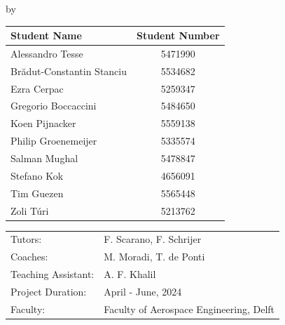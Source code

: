 
\begin{titlepage}

\begin{center}

{\makeatletter
\largetitlestyle\fontsize{45}{45}\selectfont\@title
\makeatother}

{\makeatletter
\ifdefvoid{\@subtitle}{}{\bigskip\titlestyle\fontsize{20}{20}\selectfont\@subtitle}
\makeatother}

\bigskip
\bigskip

by

\bigskip
\bigskip

{\makeatletter
\largetitlestyle\fontsize{25}{25}\selectfont\@author
\makeatother}

\bigskip
\bigskip

\setlength\extrarowheight{2pt}
\begin{tabular}{lc}
    Student Name              & Student Number \\\midrule
    Alessandro Tesse          & 5471990 \\
    Brădut-Constantin Stanciu & 5534682 \\
    Ezra Cerpac               & 5259347 \\
    Gregorio Boccaccini       & 5484650 \\
    Koen Pijnacker            & 5559138 \\
    Philip Groenemeijer       & 5335574 \\
    Salman Mughal             & 5478847 \\
    Stefano Kok               & 4656091 \\
    Tim Guezen                & 5565448 \\
    Zoli Túri                 & 5213762 \\
\end{tabular}

\vfill

\begin{tabular}{ll}
    Tutors: &  F. Scarano, F. Schrijer \\
    Coaches: & M. Moradi, T. de Ponti \\
    Teaching Assistant: & A. F. Khalil \\
    Project Duration: & April - June, 2024 \\
    Faculty: & Faculty of Aerospace Engineering, Delft
\end{tabular}


\end{center}
\end{titlepage}

